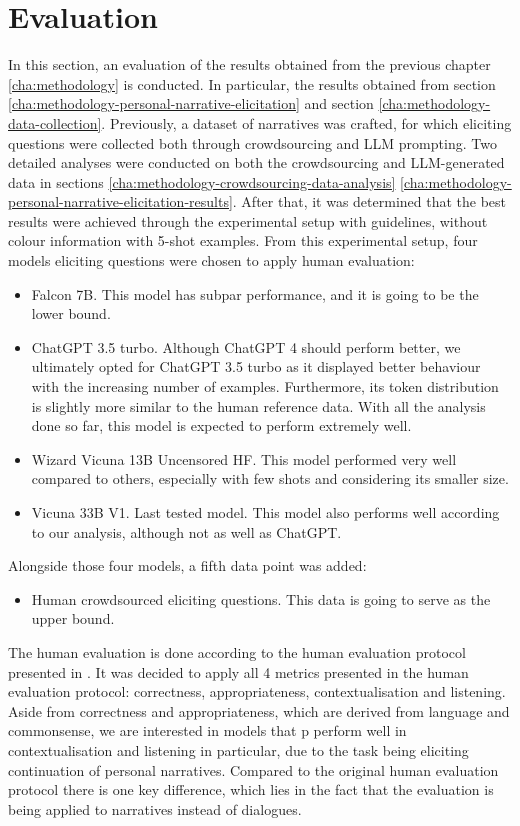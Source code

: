 \chapter{Evaluation}
\label{cha:evaluation}

In this section, an evaluation of the results obtained from the previous chapter \ref{cha:methodology} is conducted. In particular, the results obtained from section \ref{cha:methodology-personal-narrative-elicitation} and section \ref{cha:methodology-data-collection}. 
Previously, a dataset of narratives was crafted, for which eliciting questions were collected both through crowdsourcing and LLM prompting.
Two detailed analyses were conducted on both the crowdsourcing and LLM-generated data in sections \ref{cha:methodology-crowdsourcing-data-analysis} \ref{cha:methodology-personal-narrative-elicitation-results}. After that, it was determined that the best results were achieved through the experimental setup with guidelines, without colour information with 5-shot examples. 
From this experimental setup, four models eliciting questions were chosen to apply human evaluation:
\begin{itemize}
    \item Falcon 7B. This model has subpar performance, and it is going to be the lower bound.
    \item ChatGPT 3.5 turbo. Although ChatGPT 4 should perform better, we ultimately opted for ChatGPT 3.5 turbo as it displayed better behaviour with the increasing number of examples. Furthermore, its token distribution is slightly more similar to the human reference data. With all the analysis done so far, this model is expected to perform extremely well.
    \item Wizard Vicuna 13B Uncensored HF. This model performed very well compared to others, especially with few shots and considering its smaller size.
    \item Vicuna 33B V1. Last tested model. This model also performs well according to our analysis, although not as well as ChatGPT.
\end{itemize}
Alongside those four models, a fifth data point was added:
\begin{itemize}
    \item Human crowdsourced eliciting questions. This data is going to serve as the upper bound.
\end{itemize}
The human evaluation is done according to the human evaluation protocol presented in \cite{mousavi-etal-2022-evaluation}. It was decided to apply all 4 metrics presented in the human evaluation protocol: correctness, appropriateness, contextualisation and listening. Aside from correctness and appropriateness, which are derived from language and commonsense, we are interested in models that p
perform well in contextualisation and listening in particular, due to the task being eliciting continuation of personal narratives. Compared to the original human evaluation protocol there is one key difference, which lies in the fact that the evaluation is being applied to narratives instead of dialogues. 


